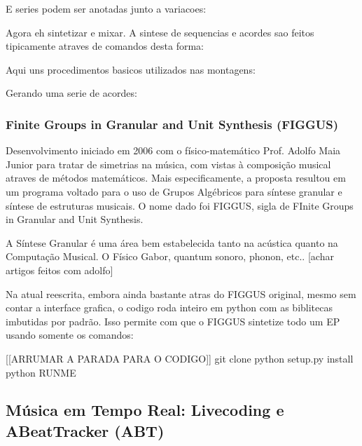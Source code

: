 

E series podem ser anotadas junto a variacoes:


Agora eh sintetizar e mixar. A sintese de sequencias e acordes sao feitos tipicamente
atraves de comandos desta forma:


Aqui uns procedimentos basicos utilizados nas montagens:


Gerando uma serie de acordes:






\subsubsection{Finite Groups in Granular and Unit Synthesis (FIGGUS)}

Desenvolvimento iniciado em 2006 com o físico-matemático Prof. Adolfo Maia Junior para
tratar de simetrias na música, com vistas à composição musical atraves
de métodos matemáticos. Mais especificamente, a proposta resultou em
um programa voltado para o uso de Grupos Algébricos para síntese
granular e síntese de estruturas musicais. O nome dado
foi FIGGUS, sigla de FInite Groups in Granular and Unit Synthesis.

A Síntese Granular é uma área bem estabelecida tanto na acústica quanto
na Computação Musical. O Físico Gabor, quantum sonoro, phonon, etc..
[achar artigos feitos com adolfo]

Na atual reescrita, embora ainda bastante atras do FIGGUS original,
mesmo sem contar a interface grafica, o codigo roda inteiro em python
com as biblitecas imbutidas por padrão. Isso permite com que o FIGGUS
sintetize todo um EP usando somente os comandos:

[[ARRUMAR A PARADA PARA O CODIGO]]
git clone
python setup.py install
python RUNME


  \subsection{Música em Tempo Real: Livecoding e ABeatTracker (ABT)}

